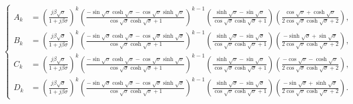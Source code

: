 \documentclass{article}
\begin{document}
\begin{equation*}
    \left\{\begin{aligned}
        A_{k} &= \left( \frac{j \beta \sqrt{\sigma }}{1+j \beta \sigma } \right)^{k} \left( \frac{ -\sin\sqrt{\sigma} \cosh\sqrt{\sigma} - \cos\sqrt{\sigma} \sinh\sqrt{\sigma} }{ \cos\sqrt{\sigma }\cosh\sqrt{\sigma }+1 } \right)^{k-1} \left( \frac{\sinh\sqrt{\sigma }-\sin\sqrt{\sigma }}{\cos\sqrt{\sigma } \cosh\sqrt{\sigma }+1} \right) \left(\frac{\cos\sqrt{\sigma }+\cosh\sqrt{\sigma }}{2 \cos\sqrt{\sigma }\cosh\sqrt{\sigma }+2} \right), \\
        B_{k} &= \left( \frac{j \beta \sqrt{\sigma }}{1+j \beta \sigma } \right)^{k}  \left( \frac{ -\sin\sqrt{\sigma} \cosh\sqrt{\sigma} - \cos\sqrt{\sigma} \sinh\sqrt{\sigma} }{ \cos\sqrt{\sigma }\cosh\sqrt{\sigma }+1 } \right)^{k-1} \left( \frac{\sinh\sqrt{\sigma }-\sin\sqrt{\sigma }}{\cos\sqrt{\sigma } \cosh\sqrt{\sigma }+1} \right) \left( \frac{-\sinh\sqrt{\sigma }+\sin\sqrt{\sigma }}{2 \cos\sqrt{\sigma }\cosh\sqrt{\sigma }+2} \right), \\
        C_{k} &= \left( \frac{j \beta \sqrt{\sigma }}{1+j \beta \sigma } \right)^{k}  \left( \frac{ -\sin\sqrt{\sigma} \cosh\sqrt{\sigma} - \cos\sqrt{\sigma} \sinh\sqrt{\sigma} }{ \cos\sqrt{\sigma }\cosh\sqrt{\sigma }+1 } \right)^{k-1} \left( \frac{\sinh\sqrt{\sigma }-\sin\sqrt{\sigma }}{\cos\sqrt{\sigma } \cosh\sqrt{\sigma }+1} \right) \left( \frac{-\cos\sqrt{\sigma }-\cosh\sqrt{\sigma }}{2 \cos\sqrt{\sigma } \cosh\sqrt{\sigma }+2} \right), \\
        D_{k} &= \left( \frac{j \beta \sqrt{\sigma }}{1+j \beta \sigma } \right)^{k} \left( \frac{ -\sin\sqrt{\sigma} \cosh\sqrt{\sigma} - \cos\sqrt{\sigma} \sinh\sqrt{\sigma} }{ \cos\sqrt{\sigma }\cosh\sqrt{\sigma }+1 } \right)^{k-1} \left( \frac{\sinh\sqrt{\sigma }-\sin\sqrt{\sigma }}{\cos\sqrt{\sigma } \cosh\sqrt{\sigma }+1} \right) \left( \frac{-\sin\sqrt{\sigma }+\sinh\sqrt{\sigma }}{2 \cos\sqrt{\sigma }\cosh\sqrt{\sigma }+2} \right).
    \end{aligned}\right.
\end{equation*}
\normalsize




\end{document}

